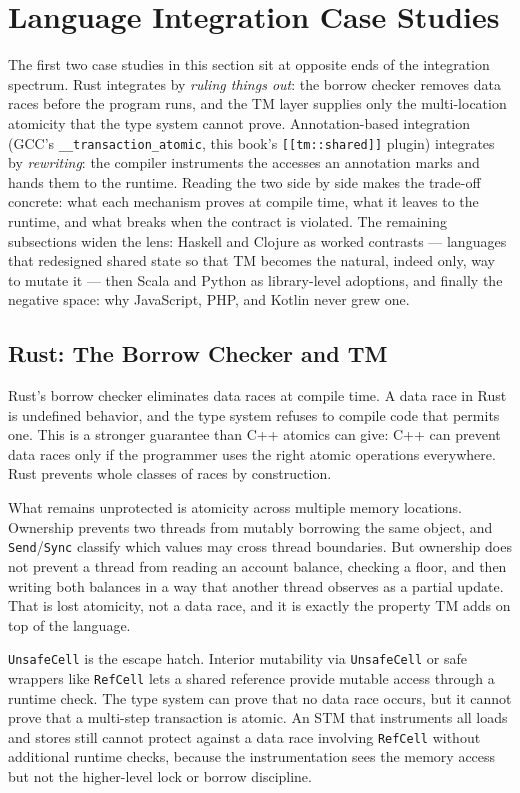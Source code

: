 \section{Language Integration Case Studies}

The first two case studies in this section sit at opposite ends of the
integration spectrum. Rust integrates by \emph{ruling things out}: the
borrow checker removes data races before the program runs, and the TM
layer supplies only the multi-location atomicity that the type system
cannot prove. Annotation-based integration (GCC's
\texttt{\_\_transaction\_atomic}, this book's \texttt{[[tm::shared]]}
plugin) integrates by \emph{rewriting}: the compiler instruments the
accesses an annotation marks and hands them to the runtime. Reading the
two side by side makes the trade-off concrete: what each mechanism proves
at compile time, what it leaves to the runtime, and what breaks when the
contract is violated. The remaining subsections widen the lens: Haskell
and Clojure as worked contrasts --- languages that redesigned shared
state so that TM becomes the natural, indeed only, way to mutate it ---
then Scala and Python as library-level adoptions, and finally the
negative space: why JavaScript, PHP, and Kotlin never grew one.

\subsection{Rust: The Borrow Checker and TM}

Rust's borrow checker eliminates data races at compile time. A data race in
Rust is undefined behavior, and the type system refuses to compile code that
permits one. This is a stronger guarantee than C++ atomics can give: C++ can
prevent data races only if the programmer uses the right atomic operations
everywhere. Rust prevents whole classes of races by construction.

What remains unprotected is atomicity across multiple memory locations.
Ownership prevents two threads from mutably borrowing the same object, and
\texttt{Send}/\texttt{Sync} classify which values may cross thread boundaries.
But ownership does not prevent a thread from reading an account balance,
checking a floor, and then writing both balances in a way that another thread
observes as a partial update. That is lost atomicity, not a data race, and it
is exactly the property TM adds on top of the language.

\texttt{UnsafeCell} is the escape hatch. Interior mutability via
\texttt{UnsafeCell} or safe wrappers like \texttt{RefCell} lets a shared
reference provide mutable access through a runtime check. The type system can
prove that no data race occurs, but it cannot prove that a multi-step
transaction is atomic. An STM that instruments all loads and stores still
cannot protect against a data race involving \texttt{RefCell} without
additional runtime checks, because the instrumentation sees the memory access
but not the higher-level lock or borrow discipline.

